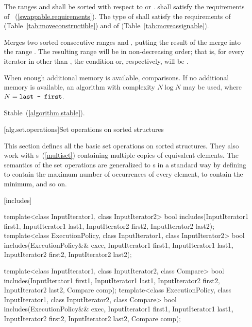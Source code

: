 \begin{itemdescr}
\pnum
\requires
The ranges  and  shall be
sorted with respect to  or .
 shall satisfy the requirements of
~(\ref{swappable.requirements}). The type
of  shall satisfy the requirements of
 (Table~\ref{tab:moveconstructible}) and of
 (Table~\ref{tab:moveassignable}).

\pnum
\effects
Merges two sorted consecutive ranges
and
,
putting the result of the merge into the range
.
The resulting range will be in non-decreasing order;
that is, for every iterator
in
other than
,
the condition
or, respectively,
will be .

\pnum
\complexity
When enough additional memory is available,
comparisons.
If no additional memory is available, an algorithm with complexity
$N \log N$ may be used, where $N = \texttt{last - first}$.

\pnum
\remarks Stable~(\ref{algorithm.stable}).
\end{itemdescr}

[alg.set.operations]{Set operations on sorted structures}

\pnum
This section defines all the basic set operations on sorted structures.
They also work with
s~(\ref{multiset})
containing multiple copies of equivalent elements.
The semantics of the set operations are generalized to
s
in a standard way by defining
to contain the maximum number of occurrences of every element,
to contain the minimum, and so on.

[includes]{}

%
\begin{itemdecl}
template<class InputIterator1, class InputIterator2>
  bool includes(InputIterator1 first1, InputIterator1 last1,
                InputIterator2 first2, InputIterator2 last2);
template<class ExecutionPolicy, class InputIterator1, class InputIterator2>
  bool includes(ExecutionPolicy&& exec,
                InputIterator1 first1, InputIterator1 last1,
                InputIterator2 first2, InputIterator2 last2);

template<class InputIterator1, class InputIterator2, class Compare>
  bool includes(InputIterator1 first1, InputIterator1 last1,
                InputIterator2 first2, InputIterator2 last2,
                Compare comp);
template<class ExecutionPolicy, class InputIterator1, class InputIterator2, class Compare>
  bool includes(ExecutionPolicy&& exec,
                InputIterator1 first1, InputIterator1 last1,
                InputIterator2 first2, InputIterator2 last2,
                Compare comp);
\end{itemdecl}

